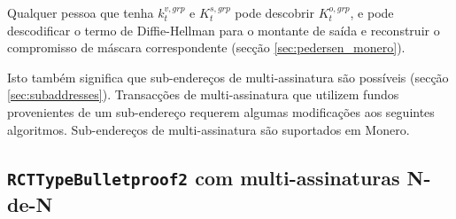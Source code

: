 Qualquer pessoa que tenha $k^{v,grp}_t$ e $K^{s,grp}_t$ pode descobrir $K^{o,grp}_t$, e pode descodificar o termo de Diffie-Hellman para o montante de saída e reconstruir o compromisso de máscara correspondente (secção \ref{sec:pedersen_monero}).


Isto também significa que sub-endereços de multi-assinatura são possíveis (secção \ref{sec:subaddresses}). Transacções de multi-assinatura que utilizem fundos provenientes de um sub-endereço requerem algumas modificações aos seguintes algoritmos. Sub-endereços de multi-assinatura são suportados em Monero.


\subsection{{\tt RCTTypeBulletproof2} com multi-assinaturas N-de-N }
\label{sec:rcttypebulletproof2-multisig}

